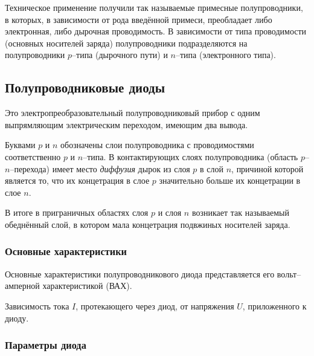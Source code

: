 Техническое применение получили так называемые примесные полупроводники, в
которых, в зависимости от рода введённой примеси, преобладает либо электронная,
либо дырочная проводимость. В зависимости от типа проводимости (основных
носителей заряда) полупроводники подразделяются на полупроводники $p$--типа
(дырочного пути) и $n$--типа (электронного типа).


\subsection{Полупроводниковые диоды}

\begin{definition}
	Это электропреобразовательный полупроводниковый прибор с одним выпрямляющим
	электрическим переходом, имеющим два вывода.
\end{definition}

Буквами $p$ и $n$ обозначены слои полупроводника с проводимостями соответственно
$p$ и $n$--типа. В контактирующих слоях полупроводника (область
$p$--$n$--перехода) имеет место \emph{диффузия} дырок из слоя $p$ в слой $n$,
причиной которой является то, что их концетрация в слое $p$ значительно больше
их концетрации в слое $n$.

В итоге в приграничных областях слоя $p$ и слоя $n$ возникает так называемый
обеднённый слой, в котором мала концетрация подвжиных носителей заряда.

\subsubsection{Основные характеристики}

Основные характеристики полупроводникового диода представляется его
вольт--амперной характеристикой (ВАХ).

\begin{definition}
	Зависимость тока $I$, протекающего через диод, от напряжения $U$, приложенного
	к диоду.
\end{definition}

\subsubsection{Параметры диода}

